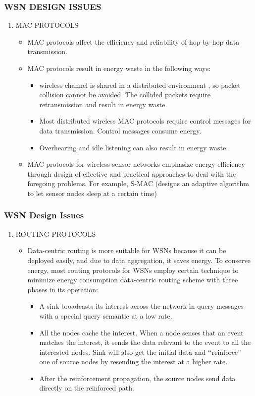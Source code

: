\documentclass[11pt]{beamer}
\begin{document}
		\begin{frame}
		\frametitle{WSN DESIGN ISSUES}	
		
		\begin{enumerate}
			\item  MAC PROTOCOLS
			\begin{itemize}
				\item MAC protocols affect the efficiency and reliability of hop-by-hop data transmission.
				\item MAC protocols result in energy waste in the following ways:
				\begin{itemize}
					\item wireless channel is shared in a distributed environment , so packet collision cannot be avoided. The collided packets require retransmission and result in energy waste.
					\item Most distributed wireless MAC protocols require control messages for data transmission. Control messages consume energy.
					\item Overhearing and idle listening can also result in energy waste.
				\end{itemize}
				\item MAC protocols for wireless sensor networks emphasize energy efficiency through design of effective and practical approaches to deal with the foregoing problems.
				For example, S-MAC (designs an adaptive algorithm to let sensor nodes sleep at a certain time)
			\end{itemize}
			\end{enumerate}
			\end{frame}
		\begin{frame}
			\frametitle{WSN Design Issues}
			\begin{enumerate}
				\item ROUTING PROTOCOLS
				\begin{itemize}
					\item Data-centric routing is more suitable for WSNs because it can be deployed easily, and due to data aggregation, it saves energy.  To conserve energy, most routing protocols for WSNs employ certain technique to minimize energy consumption
					data-centric routing scheme with three phases in its operation:
					\begin{itemize}
						\item  A sink broadcasts its interest across the network in query messages with a special query semantic at a low rate. 
						\item  All the nodes cache the interest. When a node senses that an event matches the interest, it sends the data relevant to the event to all the interested nodes.
						Sink will also get the initial data and ‘‘reinforce’’ one of source nodes by resending the interest at a higher rate.
						\item After the reinforcement propagation, the source nodes send data directly on the reinforced path.
					\end{itemize}
				\end{itemize}
			\end{enumerate}
			\end{frame}
\end{document}
